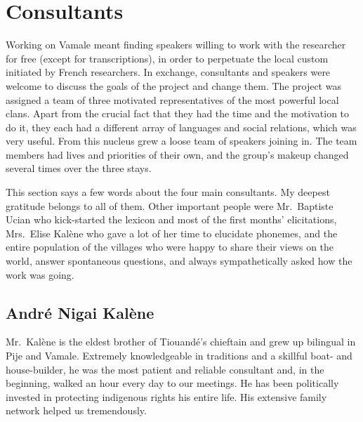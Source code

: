 \section{Consultants} 
\label{sec:Consultants}

Working on Vamale meant finding speakers willing to work with the researcher for free (except for transcriptions), in order to perpetuate the local custom initiated by French researchers. In exchange, consultants and speakers were welcome to discuss the goals of the project and change them. The project was assigned a team of three motivated representatives of the most powerful local clans. %
Apart from the crucial fact that they had the time and the motivation to do it, they each had a different array of languages and social relations, which was very useful. From this nucleus grew a loose team of speakers joining in. The team members had lives and priorities of their own, and the group's makeup changed several times over the three stays. %

This section says a few words about the four main consultants. My deepest gratitude belongs to all of them. Other important people were Mr.\ Baptiste Ucian who kick-started the lexicon and most of the first months' elicitations, Mrs.\ Elise Kalène who gave a lot of her time to elucidate phonemes, and the entire population of the villages who were happy to share their views on the world, answer spontaneous questions, and always sympathetically asked how the work was going. 

\subsection{André Nigai Kalène}
Mr.\ Kalène is the eldest brother of Tiouandé's chieftain and grew up bilingual in Pije and Vamale. Extremely knowledgeable in traditions and a skillful boat- and house-builder, he was the most patient and reliable consultant and, in the beginning, walked an hour every day to our meetings. He has been politically invested in protecting indigenous rights his entire life. His extensive family network helped us tremendously.

